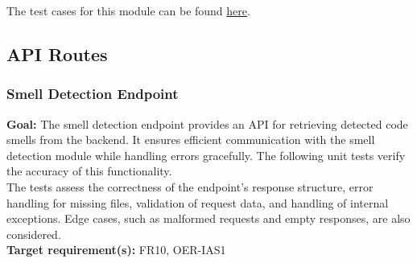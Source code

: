 \documentclass[12pt, titlepage]{article}
\begin{document}
\noindent The test cases for this module can be found \href{https://github.com/ssm-lab/capstone--sco-vs-code-plugin/blob/plugin-multi-file/test/utils/handleSmellSettings.test.ts}{here}.

\subsection{API Routes}

\subsubsection{Smell Detection Endpoint}

\textbf{Goal:} The smell detection endpoint provides an API for retrieving detected code smells from the backend. It ensures efficient communication with the smell detection module while handling errors gracefully. The following unit tests verify the accuracy of this functionality.\\

\noindent The tests assess the correctness of the endpoint’s response structure, error handling for missing files, validation of request data, and handling of internal exceptions. Edge cases, such as malformed requests and empty responses, are also considered.\\

\noindent\textbf{Target requirement(s):} FR10, OER-IAS1~\cite{SRS} \\
\end{document}
